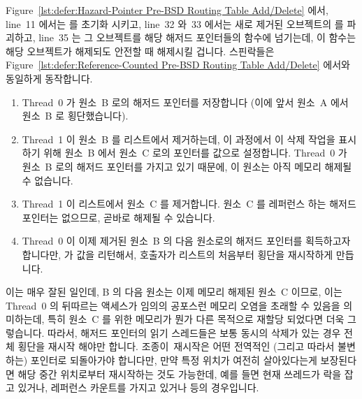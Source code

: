 Figure~\ref{lst:defer:Hazard-Pointer Pre-BSD Routing Table Add/Delete}
에서, line~11 에서는  를 초기화 시키고, line~32 와~33 에서는
새로 제거된 오브젝트의  를 파괴하고, line~35 는 그 오브젝트를
해당 해저드 포인터들의  함수에 넘기는데, 이 함수는 해당
오브젝트가 해제되도 안전할 때 해제시킬 겁니다.
스핀락들은
Figure~\ref{lst:defer:Reference-Counted Pre-BSD Routing Table Add/Delete}
에서와 동일하게 동작합니다.

\begin{enumerate}
\item	Thread~0 가 원소~B 로의 해저드 포인터를 저장합니다 (이에 앞서 원소~A
	에서 원소~B 로 횡단했습니다).
\item	Thread~1 이 원소~B 를 리스트에서 제거하는데, 이 과정에서 이 삭제 작업을
	표시하기 위해 원소~B 에서 원소~C 로의 포인터를 
	값으로 설정합니다.
	Thread~0 가 원소~B 로의 해저드 포인터를 가지고 있기 때문에, 이 원소는
	아직 메모리 해제될 수 없습니다.
\item	Thread~1 이 리스트에서 원소~C 를 제거합니다.
	원소~C 를 레퍼런스 하는 해저드 포인터는 없으므로, 곧바로 해제될 수
	있습니다.
\item	Thread~0 이 이제 제거된 원소~B 의 다음 원소로의 해저드 포인터를
	획득하고자 합니다만,  가  값을
	리턴해서, 호출자가 리스트의 처음부터 횡단을 재시작하게 만듭니다.

\end{enumerate}

이는 매우 잘된 일인데, B 의 다음 원소는 이제 메모리 해제된 원소~C 이므로, 이는
Thread~0 의 뒤따르는 액세스가 임의의 공포스런 메모리 오염을 초래할 수 있음을
의미하는데, 특히 원소~C 를 위한 메모리가 뭔가 다른 목적으로 재할당 되었다면
더욱 그렇습니다.
따라서, 해저드 포인터의 읽기 스레드들은 보통 동시의 삭제가 있는 경우 전체
횡단을 재시작 해야만 합니다.
조종이 재시작은 어떤 전역적인 (그리고 따라서 불변하는) 포인터로 되돌아가야
합니다만, 만약 특정 위치가 여전히 살아있다는게 보장된다면 해당 중간 위치로부터
재시작하는 것도 가능한데, 예를 들면 현재 쓰레드가 락을 잡고 있거나, 레퍼런스
카운트를 가지고 있거나 등의 경우입니다.
\iffalse

